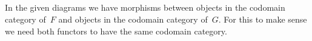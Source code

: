 \subsection{}

In the given diagrams we have morphisms between objects in the codomain category of~$F$ and objects in the codomain category of~$G$.
For this to make sense we need both functors to have the same codomain category.
